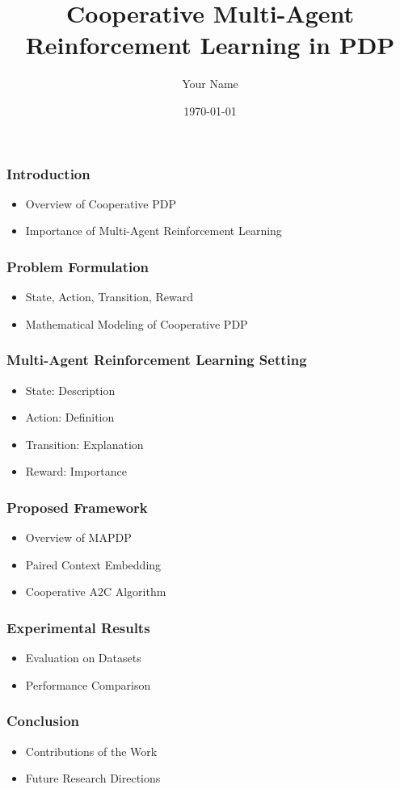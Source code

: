 \documentclass{beamer}
\title{Cooperative Multi-Agent Reinforcement Learning in PDP}
\author{Your Name}
\date{\today}
\begin{document}
\frame{\titlepage}

\begin{frame}
    \frametitle{Introduction}
    \begin{itemize}
        \item Overview of Cooperative PDP
        \item Importance of Multi-Agent Reinforcement Learning
    \end{itemize}
\end{frame}

\begin{frame}
    \frametitle{Problem Formulation}
    \begin{itemize}
        \item State, Action, Transition, Reward
        \item Mathematical Modeling of Cooperative PDP
    \end{itemize}
\end{frame}

\begin{frame}
    \frametitle{Multi-Agent Reinforcement Learning Setting}
    \begin{itemize}
        \item State: Description
        \item Action: Definition
        \item Transition: Explanation
        \item Reward: Importance
    \end{itemize}
\end{frame}

\begin{frame}
    \frametitle{Proposed Framework}
    \begin{itemize}
        \item Overview of MAPDP
        \item Paired Context Embedding
        \item Cooperative A2C Algorithm
    \end{itemize}
\end{frame}

\begin{frame}
    \frametitle{Experimental Results}
    \begin{itemize}
        \item Evaluation on Datasets
        \item Performance Comparison
    \end{itemize}
\end{frame}

\begin{frame}
    \frametitle{Conclusion}
    \begin{itemize}
        \item Contributions of the Work
        \item Future Research Directions
    \end{itemize}
\end{frame}
\end{document}
